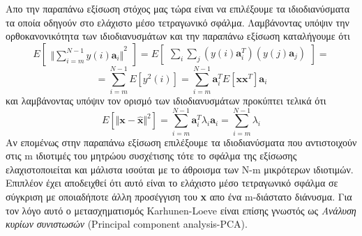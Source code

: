 Απο την παραπάνω εξίσωση στόχος μας τώρα είναι να επιλέξουμε τα ιδιοδιανύσματα τα οποία οδηγούν στο ελάχιστο μέσο τετραγωνικό σφάλμα. Λαμβάνοντας υπόψιν την ορθοκανονικότητα των ιδιοδιανυσμάτων και την παραπάνω εξίσωση καταλήγουμε ότι
\newline\hspace*{\fill}
\begin{equation}
 	Ε   \begin{bmatrix}
	{\Vert \sum_{i=m}^{N-1} y(i)\mathbf{a}_{i} \Vert}^{2}        
        \end{bmatrix}
    = Ε \begin{bmatrix}
	\sum_{i}\sum_{j} (y(i)\mathbf{a}_{i}^{T})(y(j)\mathbf{a}_{j})        
        \end{bmatrix} = 
\end{equation}
\hspace*{\fill}
\newline\hspace*{\fill}
\begin{equation}
    = \sum_{i=m}^{N-1} E[y^{2}(i)]
    = \sum_{i=m}^{N-1} \mathbf{a}_{i}^{T} E[\mathbf{x}\mathbf{x}^{T}]\mathbf{a}_{i}
\end{equation}
\hspace*{\fill}\newline
και λαμβάνοντας υπόψιν τον ορισμό των ιδιοδιανυσμάτων προκύπτει τελικά ότι
\newline\hspace*{\fill}
\begin{equation}
         Ε[{\Vert \mathbf{x}-\mathbf{\widehat{x}} \Vert}^{2}] = \sum_{i=m}^{N-1} \mathbf{a}_{i}^{Τ}\lambda_{i}\mathbf{a}_{i} = 
         \sum_{i=m}^{N-1} \lambda_{i} 
\end{equation}
\hspace*{\fill}\newline
Αν επομένως στην παραπάνω εξίσωση επιλέξουμε τα ιδιοδιανύσματα που αντιστοιχούν στις \textlatin{m} ιδιοτιμές του μητρώου συσχέτισης τότε το σφάλμα της εξίσωσης ελαχιστοποιείται και μάλιστα ισούται με το άθροισμα των \textlatin{N-m} μικρότερων ιδιοτιμών. Επιπλέον έχει αποδειχθεί ότι αυτό είναι το ελάχιστο μέσο τετραγωνικό σφάλμα σε σύγκριση με οποιαδήποτε άλλη προσέγγιση του \textlatin{\textbf{x}} απο ένα \textlatin{m}-διάστατο διάνυσμα. Για τον λόγο αυτό ο μετασχηματισμός \textlatin{Karhunen-Loeve} είναι επίσης γνωστός ως \textit{Ανάλυση κυρίων συνιστωσών} \textlatin{(Principal component analysis-PCA)}.

